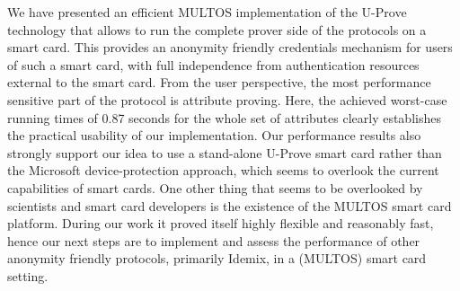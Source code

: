 We have presented an efficient MULTOS implementation of the U-Prove
technology that allows to run the complete prover side of the protocols
on a smart card. This provides an anonymity friendly credentials
mechanism for users of such a smart card, with full independence from
authentication resources external to the smart card. From the user
perspective, the most performance sensitive part of the protocol is
attribute proving. Here, the achieved worst-case running
times of 0.87 seconds for
the whole set of attributes clearly establishes the practical
usability of our implementation. Our performance results also strongly
support our idea to use a stand-alone U-Prove smart card rather than
the Microsoft device-protection approach, which seems to overlook the current
capabilities of smart cards. One other thing that seems to be overlooked by scientists and smart
card developers is the existence of the MULTOS smart card platform.
During our work it proved itself highly flexible and reasonably fast, hence our next steps
are to implement and assess the performance of other anonymity
friendly protocols, primarily Idemix, in a (MULTOS) smart card setting.


